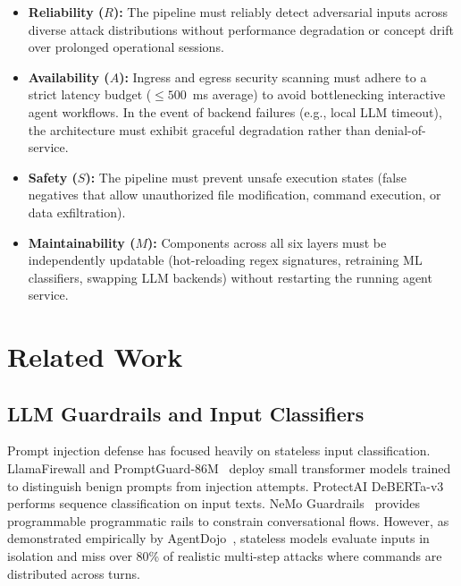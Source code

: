 \documentclass[conference]{IEEEtran}
\begin{document}
\begin{itemize}[leftmargin=*]
    \item \textbf{Reliability ($R$):} The pipeline must reliably detect adversarial inputs across diverse attack distributions without performance degradation or concept drift over prolonged operational sessions.
    \item \textbf{Availability ($A$):} Ingress and egress security scanning must adhere to a strict latency budget ($\leq 500$~ms average) to avoid bottlenecking interactive agent workflows. In the event of backend failures (e.g., local LLM timeout), the architecture must exhibit graceful degradation rather than denial-of-service.
    \item \textbf{Safety ($S$):} The pipeline must prevent unsafe execution states (false negatives that allow unauthorized file modification, command execution, or data exfiltration).
    \item \textbf{Maintainability ($M$):} Components across all six layers must be independently updatable (hot-reloading regex signatures, retraining ML classifiers, swapping LLM backends) without restarting the running agent service.
\end{itemize}

\section{Related Work}

\subsection{LLM Guardrails and Input Classifiers}
Prompt injection defense has focused heavily on stateless input classification. LlamaFirewall and PromptGuard-86M~\cite{llamafirewall2024} deploy small transformer models trained to distinguish benign prompts from injection attempts. ProtectAI DeBERTa-v3~\cite{protectai2024} performs sequence classification on input texts. NeMo Guardrails~\cite{nemoguardrails2023} provides programmable programmatic rails to constrain conversational flows. However, as demonstrated empirically by AgentDojo~\cite{agentdojo2024}, stateless models evaluate inputs in isolation and miss over 80\% of realistic multi-step attacks where commands are distributed across turns.
\end{document}
